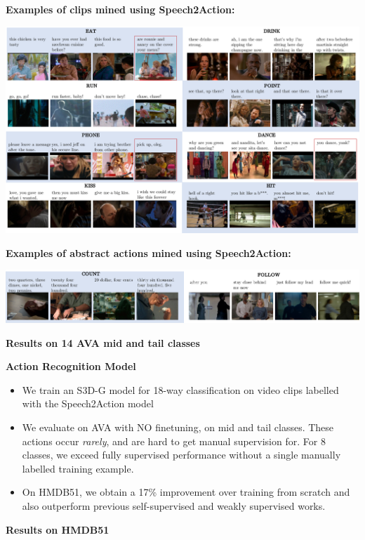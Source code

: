 \documentclass[landscape,a0paper,fontscale=0.292]{baposter}
\begin{document}
\begin{poster}
{    \vspace{0.5em}
    \textbf{\color{blue}Examples of clips mined using Speech2Action:}
    \begin{center}
        \vspace{-0.8em}
        \includegraphics[width=0.94\linewidth]{images/mining_cropped.pdf}
        \vspace{-1em}
    \end{center}
\textbf{\color{blue}Examples of abstract actions mined using Speech2Action:}
    \begin{center}
     \vspace{-0.8em}
    \includegraphics[width=0.94\linewidth]{images/mining_unusual.pdf}
    \vspace{-1em}
   \end{center}
    \vspace{0.5em}
    {\bf\color{blue}Results on 14 AVA mid and tail classes}
    \vspace{0.2em}
    
    
\begin{minipage}{0.5\linewidth}
{\bf\color{blue}Action Recognition Model}
\begin{itemize}
    \item We train an S3D-G model for 18-way classification on video clips labelled with the Speech2Action model 
    \item We evaluate on AVA with NO finetuning, on mid and tail classes. These actions occur \textit{rarely}, and are hard to get manual supervision for. For 8 classes, we exceed fully supervised performance without a single manually labelled training example.
    \item On HMDB51, we obtain a 17\% improvement over training from scratch and also outperform previous self-supervised and weakly supervised works.
\end{itemize}
\end{minipage}   
\begin{minipage}{0.5\linewidth}
    \vspace{1em}
{\bf\color{blue} \quad Results on HMDB51}
\vspace{-0.3em}
\begin{flushright}

\end{flushright}
 

\end{minipage}}
\end{poster}
\end{document}
